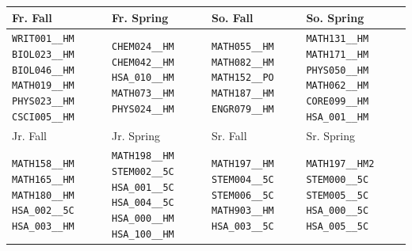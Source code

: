 \begin{tabular}{|p{}|p{}|p{}|p{}|}
    \hline
    Fr. Fall & Fr. Spring & So. Fall & So. Spring\\\hline
    \verb|WRIT001__HM| \verb|BIOL023__HM| \verb|BIOL046__HM| \verb|MATH019__HM| \verb|PHYS023__HM| \verb|CSCI005__HM|&
    \verb|CHEM024__HM| \verb|CHEM042__HM| \verb|HSA_010__HM| \verb|MATH073__HM| \verb|PHYS024__HM|&
    \verb|MATH055__HM| \verb|MATH082__HM| \verb|MATH152__PO| \verb|MATH187__HM| \verb|ENGR079__HM|&
    \verb|MATH131__HM| \verb|MATH171__HM| \verb|PHYS050__HM| \verb|MATH062__HM| \verb|CORE099__HM| \verb|HSA_001__HM|\\
    \hline
    Jr. Fall & Jr. Spring & Sr. Fall & Sr. Spring\\\hline
    \verb|MATH158__HM| \verb|MATH165__HM| \verb|MATH180__HM| \verb|HSA_002__5C| \verb|HSA_003__HM|&
    \verb|MATH198__HM| \verb|STEM002__5C| \verb|HSA_001__5C| \verb|HSA_004__5C| \verb|HSA_000__HM| \verb|HSA_100__HM|&
    \verb|MATH197__HM| \verb|STEM004__5C| \verb|STEM006__5C| \verb|MATH903__HM| \verb|HSA_003__5C|&
    \verb|MATH197__HM2| \verb|STEM000__5C| \verb|STEM005__5C| \verb|HSA_000__5C| \verb|HSA_005__5C|\\
    \hline
\end{tabular}